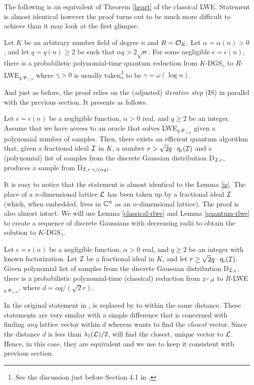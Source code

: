 The following is an equivalent of Theorem \ref{heart} of the classical LWE. Statement is almost identical however the proof turns out to be much more difficult to achieve than it may look at the first glimpse.
\begin{theorem}
	Let $K$ be an arbitrary number field of degree $n$ and $R = \mathcal{O}_K$. Let $\alpha = \alpha(n) > 0$, and let $q = q(n) \geq 2$ be such that $\alpha q > 2 \sqrt{n}$. For some negligible $\epsilon = \epsilon(n)$, there is a probabilistic polynomial-time quantum reduction from $K$-DGS$_{\gamma}$ to $R$-LWE$_{q,\Psi_{\leq \alpha}}$ where $\gamma > 0$ is usually taken\footnote{See the discussion just before Section 4.1 in \cite{ring-lwe}.} to be $\gamma = \omega(\log n)$.
\end{theorem}
And just as before, the proof relies on the (adjusted) \textit{iterative step} (IS) in parallel with the previous section. It presents as follows.
\begin{lemma}
Let $\epsilon = \epsilon(n)$ be a negligible function, $\alpha > 0$ real, and $q \geq 2$ be an integer. Assume that we have access to an oracle that solves LWE$_{q, \Psi_{\leq \alpha}}$ given a polynomial number of samples. Then, there exists an efficient quantum algorithm that, given a fractional ideal $\mathcal{I}$ in $K$, a number $r > \sqrt{2}q \cdot \eta_{\epsilon}(\mathcal{I})$ and a (polynomial) list of samples from the discrete Gaussian distribution D$_{\mathcal{I},r}$, produces a sample from D$_{\mathcal{I},r \cdot \gamma/(\alpha q)}$.	
\end{lemma}
It is easy to notice that the statement is almost identical to the Lemma \ref{is}. The place of a $n$-dimensional lattice $\mathcal{L}$ has been taken up by a fractional ideal $\mathcal{I}$ (which, when embedded, lives in $\mathbb{C}^n$ as an $n$-dimensional lattice). The proof is also almost intact. We will use Lemma \ref{classical-rlwe} and Lemma \ref{quantum-rlwe} to create a sequence of discrete Gaussians with decreasing radii to obtain the solution to $K$-DGS$_{\gamma}$.
\begin{lemma}\label{classical-rlwe}
	Let $\epsilon = \epsilon(n)$ be a negligible function, $\alpha > 0$ real, and $q \geq 2$ be an integer with known factorization. Let $\mathcal{I}$ be a fractional ideal in $K$, and let $r \geq \sqrt{2}q \cdot \eta_{\epsilon}(\mathcal{I})$. Given polynomial list of samples from the discrete Gaussian distribution D$_{\mathcal{I},r}$, there is a probabilistic polynomial-time (classical) reduction from $_{\mathcal{I}^{\vee},d}$ to $R$-LWE$_{q,\Psi_{\leq \alpha}}$, where $d = \alpha q/(\sqrt{2}r)$.
\end{lemma}
\begin{remark}
	In the original statement in \cite{ring-lwe},  is replaced by  to within the same distance. These statements are very similar with a simple difference that  is concerned with finding \textit{any} lattice vector within $d$ whereas  wants to find the \textit{closest} vector. Since the distance $d$ is less than $\lambda_1(\mathcal{L})/2$,  will find the closest, unique vector to $\mathcal{L}$. Hence, in this case, they are equivalent and we use  to keep it consistent with previous section.
\end{remark}

